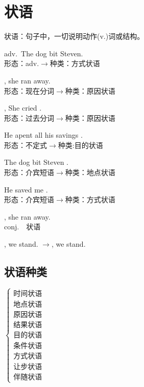 \section{状语}
\begin{definition}
	状语：句子中，一切说明动作(v.)词或结构。
\end{definition}
\begin{example}
	adv.\ The dog  bit Steven.\\
	形态：adv.$\rightarrow$种类：方式状语
\end{example}
\begin{example}
	, she ran away.\\形态：现在分词$\rightarrow$种类：原因状语
\end{example}
\begin{example}
	, She cried .\\
	形态：过去分词$\rightarrow$种类：原因状语
\end{example}
\begin{example}
	He apent all his savings .\\
	形态：不定式$\rightarrow$种类:目的状语
\end{example}
\begin{example}
	The dog  bit Steven .\\
	形态：介宾短语$\rightarrow$种类：地点状语
\end{example}
\begin{example}
	He saved me .\\
	形态：介宾短语$\rightarrow$种类：方式状语
\end{example}
\begin{example}
	, she ran away.\\
	conj.\ \ 状语
\end{example}
\begin{example}
	, we stand. $\rightarrow$, we stand.
\end{example}
\subsection{状语种类}
$
\left\{
\begin{array}{l}
\textbf{时间状语}\\
\textbf{地点状语}\\
\textbf{原因状语}\\
\textbf{结果状语}\\
\textbf{目的状语}\\
\textbf{条件状语}\\
\textbf{方式状语}\\
\textbf{让步状语}\\
\textbf{伴随状语}
\end{array}
\right.
$